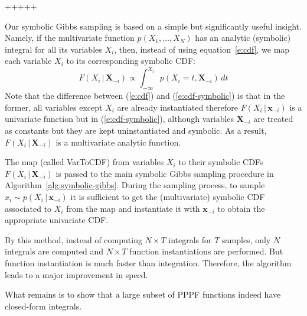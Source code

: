 \documentclass{article}
\newcommand{\bvec}[1]{\textbf{#1}}
\newcommand{\pr}{p}
\begin{document}
+++++

Our symbolic Gibbs sampling is based on a simple but significantly useful insight.
Namely, if the multivariate function $\pr(X_1, \ldots, X_N)$
has an analytic (symbolic) integral for all its variables $X_i$,
then, instead of using equation~\ref{e:cdf}, we map each variable $X_i$ to its corresponding symbolic CDF: 
{\footnotesize
\begin{equation}
\label{e:cdf-symbolic}
F(X_i  \,|\, \bvec{X}_{-i}) 
\propto
\int_{-\infty}^{X_i} \!\!\!\!\! \pr(X_i = t , \bvec{X}_{-i}) \, d  t
\end{equation} 
}
Note that the difference between (\ref{e:cdf}) and (\ref{e:cdf-symbolic}) is that in the former, 
all variables except $X_i$ are already instantiated therefore 
$F(X_i  \,|\, \bvec{x}_{-i})$ is a univariate function but in  (\ref{e:cdf-symbolic}), 
although variables $\bvec{X}_{-i}$ are treated as constants but they are kept uninstantiated and symbolic.
As a result, $F(X_i \,|\, \bvec{X}_{-i})$ is a multivariate analytic function. 

The map (called {\sc VarToCDF}) from variables $X_i$ to their symbolic CDFs
$F(X_i \,|\, \bvec{X}_{-i})$ is passed to the main symbolic Gibbs sampling procedure in Algorithm~\ref{alg:symbolic-gibbs}.
During the sampling process, 
to sample $x_i \sim \pr(X_i \,|\, \bvec{x}_{-i})$
it is sufficient to get the (multivariate) symbolic CDF associated to $X_i$ from the map
and instantiate it with $\bvec{x}_{-i}$ to obtain the appropriate univariate CDF.

By this method, instead of computing $N \times T$ integrals for $T$ samples, only $N$ integrals are computed and 
$N \times T$ function instantiations are performed. But function instantiation is much faster than integration.
Therefore, the algorithm leads to a major improvement in speed.

What remains is to show that a large subset of PPPF functions indeed have closed-form integrals. 

\end{document}
